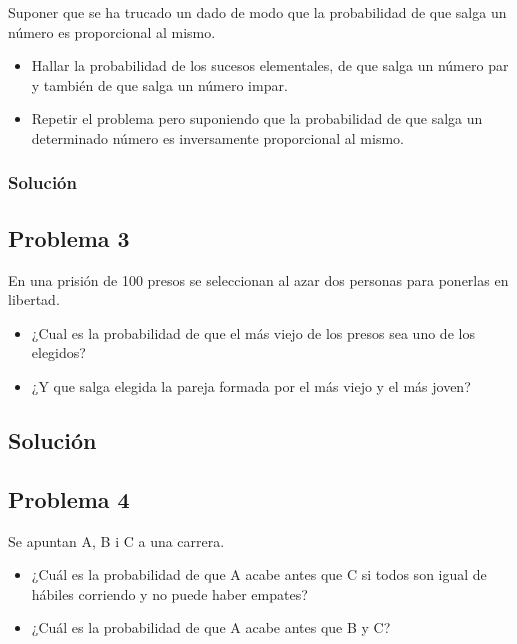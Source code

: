 \documentclass[
]{article}
\providecommand{\tightlist}{%
  \setlength{\itemsep}{0pt}\setlength{\parskip}{0pt}}
\begin{document}
Suponer que se ha trucado un dado de modo que la probabilidad de que
salga un número es proporcional al mismo.

\begin{itemize}
\tightlist
\item
  Hallar la probabilidad de los sucesos elementales, de que salga un
  número par y también de que salga un número impar.
\item
  Repetir el problema pero suponiendo que la probabilidad de que salga
  un determinado número es inversamente proporcional al mismo.
\end{itemize}

\hypertarget{soluciuxf3n-1}{%
\subsubsection{Solución}\label{soluciuxf3n-1}}

\hypertarget{problema-3}{%
\subsection{Problema 3}\label{problema-3}}

En una prisión de 100 presos se seleccionan al azar dos personas para
ponerlas en libertad.

\begin{itemize}
\tightlist
\item
  ¿Cual es la probabilidad de que el más viejo de los presos sea uno de
  los elegidos?
\item
  ¿Y que salga elegida la pareja formada por el más viejo y el más
  joven?
\end{itemize}

\hypertarget{soluciuxf3n-2}{%
\subsection{Solución}\label{soluciuxf3n-2}}

\hypertarget{problema-4}{%
\subsection{Problema 4}\label{problema-4}}

Se apuntan A, B i C a una carrera.

\begin{itemize}
\tightlist
\item
  ¿Cuál es la probabilidad de que A acabe antes que C si todos son igual
  de hábiles corriendo y no puede haber empates?
\item
  ¿Cuál es la probabilidad de que A acabe antes que B y C?
\end{itemize}
\end{document}
